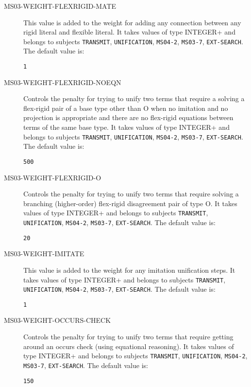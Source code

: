 \begin{description}
\item[MS03-WEIGHT-FLEXRIGID-MATE]  
This value is added to the weight for adding any connection between
any rigid literal and flexible literal.
It takes values of type INTEGER+ and belongs to subjects \texttt{TRANSMIT}, \texttt{UNIFICATION}, \texttt{MS04-2}, \texttt{MS03-7}, \texttt{EXT-SEARCH}.  The default value is: \begin{lstlisting}
1
\end{lstlisting}

\item[MS03-WEIGHT-FLEXRIGID-NOEQN]  
Controls the penalty for trying to unify two terms that require a
solving a flex-rigid pair of a base type other than O when no
imitation and no projection is appropriate and there are no flex-rigid
equations between terms of the same base type.
It takes values of type INTEGER+ and belongs to subjects \texttt{TRANSMIT}, \texttt{UNIFICATION}, \texttt{MS04-2}, \texttt{MS03-7}, \texttt{EXT-SEARCH}.  The default value is: \begin{lstlisting}
500
\end{lstlisting}

\item[MS03-WEIGHT-FLEXRIGID-O]  
Controls the penalty for trying to unify two terms that require
solving a branching (higher-order) flex-rigid disagreement pair of
type O.
It takes values of type INTEGER+ and belongs to subjects \texttt{TRANSMIT}, \texttt{UNIFICATION}, \texttt{MS04-2}, \texttt{MS03-7}, \texttt{EXT-SEARCH}.  The default value is: \begin{lstlisting}
20
\end{lstlisting}

\item[MS03-WEIGHT-IMITATE]  
This value is added to the weight for any imitation unification steps.
It takes values of type INTEGER+ and belongs to subjects \texttt{TRANSMIT}, \texttt{UNIFICATION}, \texttt{MS04-2}, \texttt{MS03-7}, \texttt{EXT-SEARCH}.  The default value is: \begin{lstlisting}
1
\end{lstlisting}

\item[MS03-WEIGHT-OCCURS-CHECK]  
Controls the penalty for trying to unify two terms that require
getting around an occurs check (using equational reasoning).
It takes values of type INTEGER+ and belongs to subjects \texttt{TRANSMIT}, \texttt{UNIFICATION}, \texttt{MS04-2}, \texttt{MS03-7}, \texttt{EXT-SEARCH}.  The default value is: \begin{lstlisting}
150
\end{lstlisting}


\end{description}
